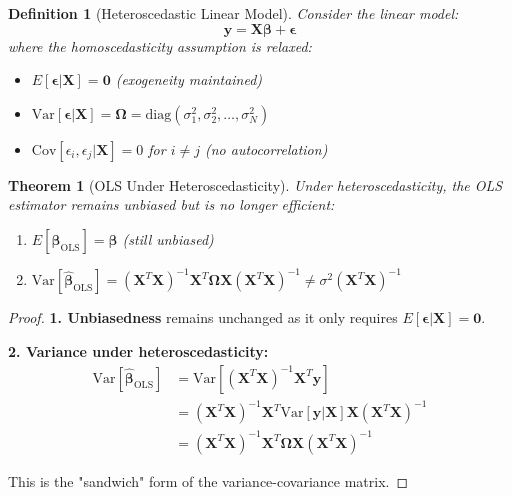\documentclass{article}
\newtheorem{definition}{Definition}
\newtheorem{theorem}{Theorem}
\begin{document}
\begin{definition}[Heteroscedastic Linear Model]
Consider the linear model:
\begin{equation}
\mathbf{y} = \mathbf{X}\boldsymbol{\beta} + \boldsymbol{\epsilon}
\end{equation}
where the homoscedasticity assumption is relaxed:
\begin{itemize}
    \item $E[\boldsymbol{\epsilon}|\mathbf{X}] = \mathbf{0}$ (exogeneity maintained)
    \item $\text{Var}[\boldsymbol{\epsilon}|\mathbf{X}] = \boldsymbol{\Omega} = \text{diag}(\sigma_1^2, \sigma_2^2, \ldots, \sigma_N^2)$
    \item $\text{Cov}[\epsilon_i, \epsilon_j|\mathbf{X}] = 0$ for $i \neq j$ (no autocorrelation)
\end{itemize}
\end{definition}

\begin{theorem}[OLS Under Heteroscedasticity]
Under heteroscedasticity, the OLS estimator remains unbiased but is no longer efficient:
\begin{enumerate}
    \item $E[\hat{\boldsymbol{\beta}}_{\text{OLS}}] = \boldsymbol{\beta}$ (still unbiased)
    \item $\text{Var}[\hat{\boldsymbol{\beta}}_{\text{OLS}}] = (\mathbf{X}^T\mathbf{X})^{-1}\mathbf{X}^T\boldsymbol{\Omega}\mathbf{X}(\mathbf{X}^T\mathbf{X})^{-1} \neq \sigma^2(\mathbf{X}^T\mathbf{X})^{-1}$
\end{enumerate}
\end{theorem}

\begin{proof}
\textbf{1. Unbiasedness} remains unchanged as it only requires $E[\boldsymbol{\epsilon}|\mathbf{X}] = \mathbf{0}$.

\textbf{2. Variance under heteroscedasticity:}
\begin{align}
\text{Var}[\hat{\boldsymbol{\beta}}_{\text{OLS}}] &= \text{Var}[(\mathbf{X}^T\mathbf{X})^{-1}\mathbf{X}^T\mathbf{y}] \\
&= (\mathbf{X}^T\mathbf{X})^{-1}\mathbf{X}^T\text{Var}[\mathbf{y}|\mathbf{X}]\mathbf{X}(\mathbf{X}^T\mathbf{X})^{-1} \\
&= (\mathbf{X}^T\mathbf{X})^{-1}\mathbf{X}^T\boldsymbol{\Omega}\mathbf{X}(\mathbf{X}^T\mathbf{X})^{-1}
\end{align}

This is the "sandwich" form of the variance-covariance matrix.
\end{proof}
\end{document}

